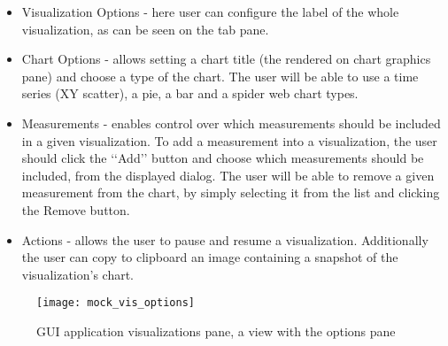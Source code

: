 \begin{itemize}

\item Visualization Options - here user can configure the label of the whole visualization, as can be seen on the tab pane.

\item Chart Options - allows setting a chart title (the rendered on chart graphics pane) and choose a type of the chart. The user will be able to use a time series (XY scatter), a pie, a bar and a spider web chart types.

\item Measurements - enables control over which measurements should be included in a given visualization. To add a measurement into a visualization, the user should click the \lq\lq{}Add\rq\rq{} button and choose which measurements should be included, from the displayed dialog. The user will be able to remove a given measurement from the chart, by simply selecting it from the list and clicking the Remove button.

\item Actions - allows the user to pause and resume a visualization. Additionally the user can copy to clipboard an image containing a snapshot of the visualization's chart.
\end{itemize}

\begin{figure}[ht]
\centering
\texttt{[image: mock\_vis\_options]}
\caption{GUI application visualizations pane, a view with the options pane}
\label{fig:mock_vis_options}
\end{figure}

